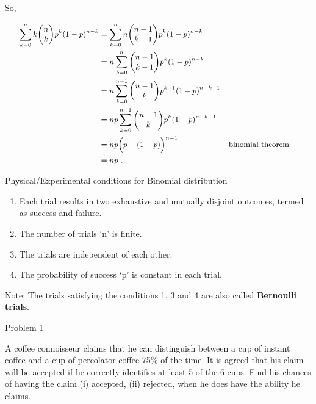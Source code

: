 \documentclass[ignorenonframetext,aspectratio=169]{beamer}
\providecommand{\tightlist}{%
  \setlength{\itemsep}{0pt}\setlength{\parskip}{0pt}}
\begin{document}
\begin{frame}{}
\protect\hypertarget{section-21}{}

So,

\[
\small
\begin{aligned}
\sum^n_{k=0}k\binom nkp^k(1-p)^{n-k}&=\sum_{k=0}^nn\binom{n-1}{k-1}p^k(1-p)^{n-k}\\
&=n\sum_{k=0}^n\binom{n-1}{k-1}p^k(1-p)^{n-k}\\
&=n\sum_{k=0}^{n-1}\binom{n-1}kp^{k+1}(1-p)^{n-k-1}\\
&=np\sum_{k=0}^{n-1}\binom{n-1}kp^k(1-p)^{n-k-1}\\
&=np\Big(p+(1-p)\Big)^{n-1}&&\text{binomial theorem}\\
&=np\ .
\end{aligned}
\]

\end{frame}

\begin{frame}{Physical/Experimental conditions for Binomial
distribution}
\protect\hypertarget{physicalexperimental-conditions-for-binomial-distribution}{}

\begin{enumerate}
\tightlist
\item
  Each trial results in two exhaustive and mutually disjoint outcomes,
  termed as success and failure.
\item
  The number of trials `n' is finite.
\item
  The trials are independent of each other.
\item
  The probability of success `p' is constant in each trial.
\end{enumerate}

Note: The trials satisfying the conditions 1, 3 and 4 are also called
\textbf{Bernoulli trials}.

\end{frame}

\begin{frame}{Problem 1}
\protect\hypertarget{problem-1-2}{}

\small

A coffee connoisseur claims that he can distinguish between a cup of
instant coffee and a cup of percolator coffee 75\% of the time. It is
agreed that his claim will be accepted if he correctly identifies at
least 5 of the 6 cups. Find his chances of having the claim (i)
accepted, (ii) rejected, when he does have the ability he claims.

\end{frame}
\end{document}
